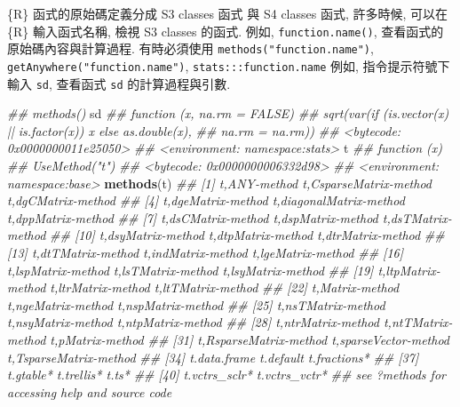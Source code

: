 \documentclass[
]{book}
\newenvironment{Shaded}{\begin{snugshade}}{\end{snugshade}}
\newcommand{\CommentTok}[1]{\textcolor[rgb]{0.56,0.35,0.01}{\textit{#1}}}
\newcommand{\KeywordTok}[1]{\textcolor[rgb]{0.13,0.29,0.53}{\textbf{#1}}}
\newcommand{\NormalTok}[1]{#1}
\begin{document}
\{R\} 函式的原始碼定義分成
S3 classes 函式 與 S4 classes 函式,
許多時候, 可以在 \{R\} 輸入函式名稱,
檢視 S3 classes 的函式.
例如,
\texttt{function.name()},
查看函式的原始碼內容與計算過程.
有時必須使用 \texttt{methods("function.name")},
\texttt{getAnywhere("function.name")},
\texttt{stats:::function.name}
例如,
指令提示符號下輸入 \texttt{sd},
查看函式 \texttt{sd} 的計算過程與引數.

\begin{Shaded}
\begin{Highlighting}[]
\CommentTok{\#\# methods()}
\NormalTok{sd}
\CommentTok{\#\# function (x, na.rm = FALSE) }
\CommentTok{\#\# sqrt(var(if (is.vector(x) || is.factor(x)) x else as.double(x), }
\CommentTok{\#\#     na.rm = na.rm))}
\CommentTok{\#\# \textless{}bytecode: 0x0000000011e25050\textgreater{}}
\CommentTok{\#\# \textless{}environment: namespace:stats\textgreater{}}
\NormalTok{t}
\CommentTok{\#\# function (x) }
\CommentTok{\#\# UseMethod("t")}
\CommentTok{\#\# \textless{}bytecode: 0x0000000006332d98\textgreater{}}
\CommentTok{\#\# \textless{}environment: namespace:base\textgreater{}}
\KeywordTok{methods}\NormalTok{(t)}
\CommentTok{\#\#  [1] t,ANY{-}method            t,CsparseMatrix{-}method  t,dgCMatrix{-}method     }
\CommentTok{\#\#  [4] t,dgeMatrix{-}method      t,diagonalMatrix{-}method t,dppMatrix{-}method     }
\CommentTok{\#\#  [7] t,dsCMatrix{-}method      t,dspMatrix{-}method      t,dsTMatrix{-}method     }
\CommentTok{\#\# [10] t,dsyMatrix{-}method      t,dtpMatrix{-}method      t,dtrMatrix{-}method     }
\CommentTok{\#\# [13] t,dtTMatrix{-}method      t,indMatrix{-}method      t,lgeMatrix{-}method     }
\CommentTok{\#\# [16] t,lspMatrix{-}method      t,lsTMatrix{-}method      t,lsyMatrix{-}method     }
\CommentTok{\#\# [19] t,ltpMatrix{-}method      t,ltrMatrix{-}method      t,ltTMatrix{-}method     }
\CommentTok{\#\# [22] t,Matrix{-}method         t,ngeMatrix{-}method      t,nspMatrix{-}method     }
\CommentTok{\#\# [25] t,nsTMatrix{-}method      t,nsyMatrix{-}method      t,ntpMatrix{-}method     }
\CommentTok{\#\# [28] t,ntrMatrix{-}method      t,ntTMatrix{-}method      t,pMatrix{-}method       }
\CommentTok{\#\# [31] t,RsparseMatrix{-}method  t,sparseVector{-}method   t,TsparseMatrix{-}method }
\CommentTok{\#\# [34] t.data.frame            t.default               t.fractions*           }
\CommentTok{\#\# [37] t.gtable*               t.trellis*              t.ts*                  }
\CommentTok{\#\# [40] t.vctrs\_sclr*           t.vctrs\_vctr*          }
\CommentTok{\#\# see \textquotesingle{}?methods\textquotesingle{} for accessing help and source code}

\end{Highlighting}
\end{Shaded}
\end{document}
